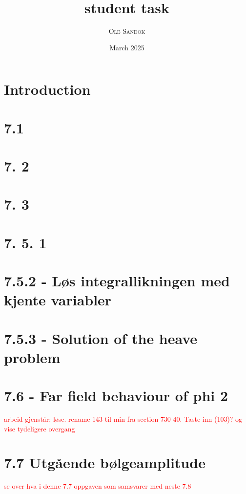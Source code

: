 \documentclass{article}
\title{student task}
\subtitle{\textit{\headcourse}}
\author{\textsc{Ole Sandok}}
\date{March 2025} %
\begin{document}
\maketitle 
\thispagestyle{fancy}

\section{Introduction}

\section{7.1}
%

\section{7. 2}
%

\section{7. 3}
%

\section{7. 5. 1}
%

\section{7.5.2 - Løs integrallikningen med kjente variabler}
%

\section{7.5.3 - Solution of the heave problem}
%

\section{7.6 - Far field behaviour of phi 2}
%
\textcolor{red}{arbeid gjenstår: løse. rename 143 til min fra section 730-40. Taste inn (103)? og vise tydeligere overgang}

\section{7.7 Utgående bølgeamplitude}
%
\textcolor{red}{se over hva i denne 7.7 oppgaven som samsvarer med neste 7.8}
\end{document}
